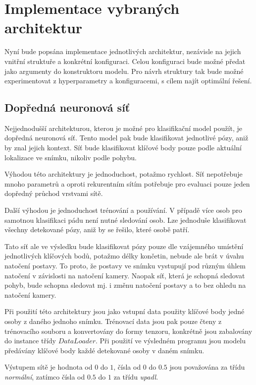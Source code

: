 \section{Implementace vybraných architektur}
\label{sec:SelectedArchitectures}

Nyní bude popsána implementace jednotlivých architektur, nezávisle na jejich
vnitřní struktuře a konkrétní konfiguraci. Celou konfiguraci bude možné předat
jako argumenty do konstruktoru modelu. Pro návrh struktury tak bude možné
experimentovat z hyperparametry a konfiguracemi, s cílem najít optimální
řešení.

\subsection{Dopředná neuronová síť}

Nejjednodušší architekturou, kterou je možné pro klasifikační model použít, je
dopředná neuronová síť. Tento model pak bude klasifikovat jednotlivé pózy, aniž
by znal jejich kontext. Síť bude klasifikovat klíčové body pouze podle aktuální
lokalizace ve snímku, nikoliv podle pohybu.

Výhodou této architektury je jednoduchost, potažmo rychlost. Síť nepotřebuje
mnoho parametrů a oproti rekurentním sítím potřebuje pro evaluaci pouze jeden
dopředný průchod vrstvami sítě.

Další výhodou je jednoduchost trénování a používání. V případě více osob pro
samotnou klasifikaci pádu není nutné sledování osob. Lze jednoduše klasifikovat
všechny detekované pózy, aniž by se řešilo, které osobě patří.

Tato síť ale ve výsledku bude klasifikovat pózy pouze dle vzájemného umístění
jednotlivých klíčových bodů, potažmo délky končetin, nebude ale brát v úvahu
natočení postavy. To proto, že postavy ve snímku vystupují pod různým úhlem
natočení v závislosti na natočení kamery. Naopak síť, která je schopná sledovat
pohyb, bude schopna sledovat mj. i změnu natočení postavy a to bez ohledu na
natočení kamery.

Při použití této architektury jsou jako vstupní data použity klíčové body jedné
osoby z daného jednoho snímku. Trénovací data jsou pak pouze čteny z
trénovacího souboru a konvertovány do formy tenzoru, konkrétně jsou zabalovány
do instance třídy $DataLoader$. Při použití ve výsledném programu jsou modelu
předávány klíčové body každé detekované osoby v daném snímku.

Výstupem sítě je hodnota od $0$ do $1$, čísla od $0$ do $0.5$ jsou považována
za třídu \textit{normální}, zatímco čísla od $0.5$ do $1$ za třídu
\textit{upadl}.

